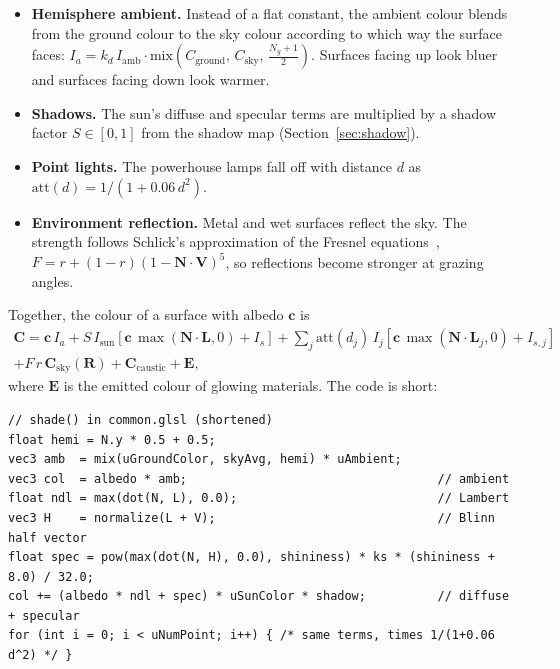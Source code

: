 \documentclass[11pt,a4paper]{report}
\newcommand{\vect}[1]{\mathbf{#1}}
\begin{document}
\begin{itemize}
  \item \textbf{Hemisphere ambient.} Instead of a flat constant, the ambient colour
        blends from the ground colour to the sky colour according to which way the
        surface faces:
        $I_a = k_d\, I_{\text{amb}}\cdot\text{mix}\!\left(C_{\text{ground}},\,C_{\text{sky}},\,\tfrac{N_y+1}{2}\right)$.
        Surfaces facing up look bluer and surfaces facing down look warmer.
  \item \textbf{Shadows.} The sun's diffuse and specular terms are multiplied by a
        shadow factor $S\in[0,1]$ from the shadow map (Section~\ref{sec:shadow}).
  \item \textbf{Point lights.} The powerhouse lamps fall off with distance $d$ as
        $\text{att}(d) = 1/(1 + 0.06\,d^2)$.
  \item \textbf{Environment reflection.} Metal and wet surfaces reflect the sky. The
        strength follows Schlick's approximation of the Fresnel equations~\cite{schlick},
        $F = r + (1-r)(1-\vect{N}\cdot\vect{V})^5$, so reflections become stronger at
        grazing angles.
\end{itemize}
Together, the colour of a surface with albedo $\vect{c}$ is
\begin{multline}
\vect{C} = \vect{c}\,I_a
 + S\,I_{\text{sun}}\!\left[\vect{c}\,\max(\vect{N}\cdot\vect{L},0) + I_s\right]
 + \sum_{j}\text{att}(d_j)\,I_j\!\left[\vect{c}\,\max(\vect{N}\cdot\vect{L}_j,0)+I_{s,j}\right]\\
 + F\,r\,\vect{C}_{\text{sky}}(\vect{R}) + \vect{C}_{\text{caustic}} + \vect{E},
\end{multline}
where $\vect{E}$ is the emitted colour of glowing materials. The code is short:

\noindent\begin{minipage}{\linewidth}
\begin{lstlisting}
// shade() in common.glsl (shortened)
float hemi = N.y * 0.5 + 0.5;
vec3 amb  = mix(uGroundColor, skyAvg, hemi) * uAmbient;
vec3 col  = albedo * amb;                                   // ambient
float ndl = max(dot(N, L), 0.0);                            // Lambert
vec3 H    = normalize(L + V);                               // Blinn half vector
float spec = pow(max(dot(N, H), 0.0), shininess) * ks * (shininess + 8.0) / 32.0;
col += (albedo * ndl + spec) * uSunColor * shadow;          // diffuse + specular
for (int i = 0; i < uNumPoint; i++) { /* same terms, times 1/(1+0.06 d^2) */ }
\end{lstlisting}
\end{minipage}
\end{document}

